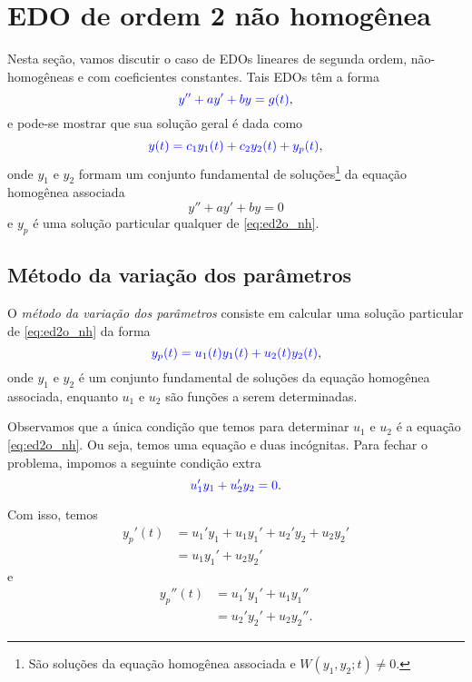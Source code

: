 \section{EDO de ordem 2 não homogênea}\label{cap_edolin_sec_edo2III}

Nesta seção, vamos discutir o caso de EDOs lineares de segunda ordem, não-homogêneas e com coeficientes constantes. Tais EDOs têm a forma
\begin{equation}\label{eq:ed2o_nh}
  {\color{blue}y'' + ay' + by = g(t)},
\end{equation}
e pode-se mostrar que sua solução geral é dada como
\begin{equation}
  {\color{blue}y(t) = c_1y_1(t) + c_2y_2(t) + y_p(t)},
\end{equation}
onde $y_1$ e $y_2$ formam um conjunto fundamental de soluções\footnote{São soluções da equação homogênea associada e $W(y_1,y_2;t)\neq 0$.} da equação homogênea associada
\begin{equation}
  y'' + ay' + by = 0
\end{equation}
e $y_p$ é uma solução particular qualquer de \eqref{eq:ed2o_nh}.

\subsection{Método da variação dos parâmetros}

O \emph{método da variação dos parâmetros} consiste em calcular uma solução particular de \eqref{eq:ed2o_nh} da forma
\begin{equation}
  {\color{blue}y_p(t) = u_1(t)y_1(t) + u_2(t)y_2(t)},
\end{equation}
onde $y_1$ e $y_2$ é um conjunto fundamental de soluções da equação homogênea associada, enquanto $u_1$ e $u_2$ são funções a serem determinadas.

Observamos que a única condição que temos para determinar $u_1$ e $u_2$ é a equação \eqref{eq:ed2o_nh}. Ou seja, temos uma equação e duas incógnitas. Para fechar o problema, impomos a seguinte condição extra
\begin{equation}\label{eq:ed2o_nh_mv_1}
  {\color{blue}u_1'y_1 + u_2'y_2 = 0}.
\end{equation}

Com isso, temos
\begin{align}
  y_p'(t) &=  u_1'y_1 + u_1y_1' + u_2'y_2 + u_2y_2' \\
          &= u_1y_1' + u_2y_2'
\end{align}
e
\begin{align}
  y_p''(t) &= u_1'y_1' + u_1y_1'' \\
           &= u_2'y_2' + u_2y_2''.
\end{align}

